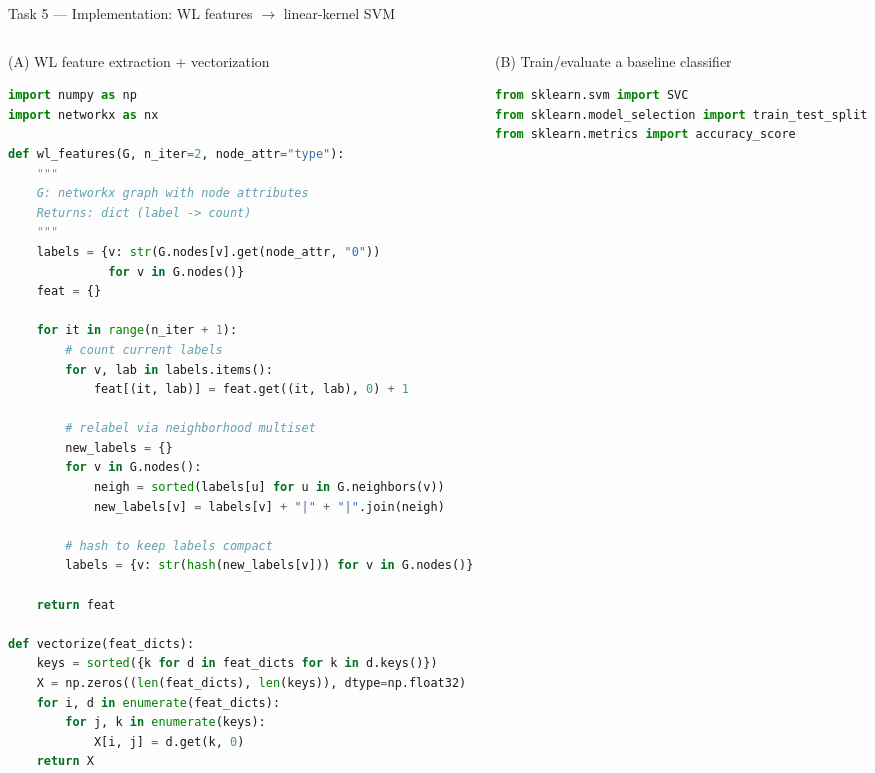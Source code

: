 \documentclass[aspectratio=169,xcolor={dvipsnames}]{beamer}
\begin{document}
\begin{frame}[fragile,shrink=46]{Task 5 — Implementation: WL features $\rightarrow$ linear-kernel SVM}
\small
\begin{columns}[T,onlytextwidth]

\begin{column}{0.48\textwidth}
\begin{block}{(A) WL feature extraction + vectorization}
\footnotesize
\begin{lstlisting}[language=Python,basicstyle=\ttfamily\scriptsize]
import numpy as np
import networkx as nx

def wl_features(G, n_iter=2, node_attr="type"):
    """
    G: networkx graph with node attributes
    Returns: dict (label -> count)
    """
    labels = {v: str(G.nodes[v].get(node_attr, "0"))
              for v in G.nodes()}
    feat = {}

    for it in range(n_iter + 1):
        # count current labels
        for v, lab in labels.items():
            feat[(it, lab)] = feat.get((it, lab), 0) + 1

        # relabel via neighborhood multiset
        new_labels = {}
        for v in G.nodes():
            neigh = sorted(labels[u] for u in G.neighbors(v))
            new_labels[v] = labels[v] + "|" + "|".join(neigh)

        # hash to keep labels compact
        labels = {v: str(hash(new_labels[v])) for v in G.nodes()}

    return feat

def vectorize(feat_dicts):
    keys = sorted({k for d in feat_dicts for k in d.keys()})
    X = np.zeros((len(feat_dicts), len(keys)), dtype=np.float32)
    for i, d in enumerate(feat_dicts):
        for j, k in enumerate(keys):
            X[i, j] = d.get(k, 0)
    return X
\end{lstlisting}
\end{block}
\end{column}

\begin{column}{0.48\textwidth}
\begin{block}{(B) Train/evaluate a baseline classifier}
\footnotesize
\begin{lstlisting}[language=Python,basicstyle=\ttfamily\scriptsize]
from sklearn.svm import SVC
from sklearn.model_selection import train_test_split
from sklearn.metrics import accuracy_score


\end{lstlisting}
\end{block}
\end{column}
\end{columns}
\end{frame}
\end{document}
